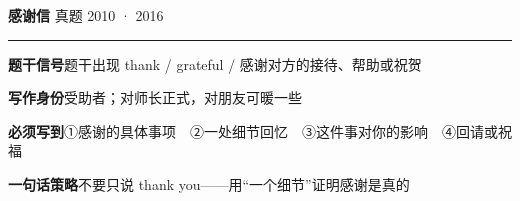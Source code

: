 \documentclass[11pt,a4paper]{ctexart}
\begin{document}
\clearpage
{}\label{g05}
\noindent{\color{accent}\rule{\linewidth}{1.5pt}}\par\vspace{3pt}
\hspace{6pt}
{\LARGE\bfseries 感谢信}\hfill
{\footnotesize\color{gray} 真题 2010 · 2016}\par
\vspace{1pt}
{\color{accent!35}\rule{\linewidth}{0.5pt}}\par\vspace{3pt}
{\footnotesize {\color{accent}\bfseries 题干信号}\quad 题干出现 thank / grateful / 感谢对方的接待、帮助或祝贺}\par
{\footnotesize {\color{accent}\bfseries 写作身份}\quad 受助者；对师长正式，对朋友可暖一些}\par
{\footnotesize {\color{accent}\bfseries 必须写到}\quad ①感谢的具体事项　②一处细节回忆　③这件事对你的影响　④回请或祝福}\par
{\footnotesize {\color{accent}\bfseries 一句话策略}\quad 不要只说 thank you——用“一个细节”证明感谢是真的}\par
\end{document}
